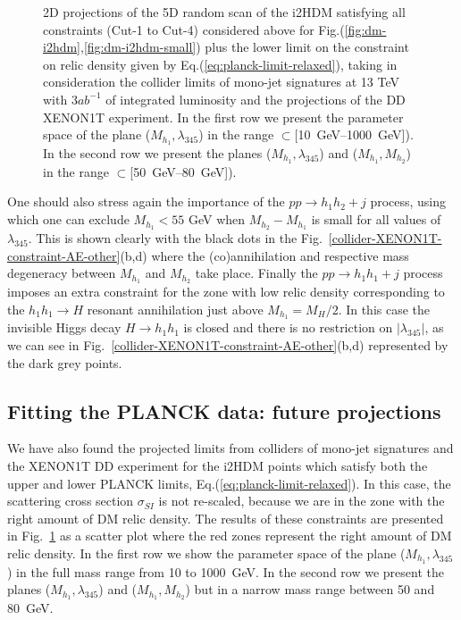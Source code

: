 \documentclass[12pt,a4paper]{article}
\begin{document}
\begin{figure}[htb]
\caption{2D projections of the 5D random scan of the i2HDM satisfying all constraints (Cut-1 to Cut-4) considered above for Fig.(\ref{fig:dm-i2hdm},\ref{fig:dm-i2hdm-small}) plus the lower limit on the constraint on relic density given by Eq.(\ref{eq:planck-limit-relaxed}), taking in consideration the collider limits of mono-jet signatures at 13 TeV with 3$ab^{-1}$ of integrated luminosity and the projections of the DD XENON1T experiment. In the first row we present the parameter space of the plane ($M_{h_1},\lambda_{345}$) in the range $\subset $[10~GeV--1000~GeV]). In the second row we present the planes ($M_{h_1},\lambda_{345}$) and ($M_{h_1},M_{h_2}$) in the range $ \subset $[50~GeV--80~GeV]).} \label{fig:dm-i2hdm-LHC-DD}
\end{figure}

One should also stress again the  importance of the   $pp \to h_1h_2+j$ process,
using which  one can exclude $M_{h_1}<55$ GeV when  $M_{h_2}-M_{h_1}$ is small
for all values of $\lambda_{345}$.
 This is shown clearly  with the black dots in the Fig.~\ref{collider-XENON1T-constraint-AE-other}(b,d) where the (co)annihilation and respective mass degeneracy between $M_{h_1}$ and $M_{h_2}$ take place. Finally the $pp \to h_1 h_1 + j$ process imposes an extra constraint for the zone with low relic density corresponding to the $h_1h_1 \to H$ resonant annihilation just above $M_{h_1}=M_H/2$. In this case the invisible Higgs decay $H \to h_1h_1$ is closed and there is no restriction on $|\lambda_{345}|$, as we can see in Fig.~\ref{collider-XENON1T-constraint-AE-other}(b,d) represented by the dark grey points.

\subsection{Fitting the PLANCK data: future projections}

We have also found the  projected limits from colliders of mono-jet signatures  and the XENON1T DD experiment for the i2HDM points which satisfy both the upper and lower PLANCK limits, Eq.(\ref{eq:planck-limit-relaxed}). In this case, the scattering cross section $\sigma_{SI}$ is not re-scaled, because we are in the zone with the right amount of DM relic density. The results of these constraints are presented in Fig.~\ref{fig:dm-i2hdm-LHC-DD} as a scatter plot where the red zones represent the right amount of DM relic density. In the first row we show the parameter space of the plane ($M_{h_1},\lambda_{345}$) in the full
mass range from 10 to 1000~GeV. In the second row we present the planes ($M_{h_1},\lambda_{345}$) and ($M_{h_1},M_{h_2}$) but in a narrow mass range 
between 50 and 80~GeV.
%
\end{document}
